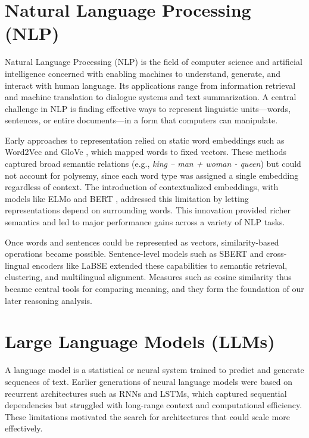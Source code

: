 
\section{Natural Language Processing (NLP)}

Natural Language Processing (NLP) is the field of computer science and artificial intelligence concerned with enabling machines to understand, generate, and interact with human language. Its applications range from information retrieval and machine translation to dialogue systems and text summarization. A central challenge in NLP is finding effective ways to represent linguistic units—words, sentences, or entire documents—in a form that computers can manipulate.

Early approaches to representation relied on static word embeddings such as Word2Vec and GloVe \parencite{mikolov2013word2vec,pennington2014glove}, which mapped words to fixed vectors. These methods captured broad semantic relations (e.g., \emph{king – man + woman - queen}) but could not account for polysemy, since each word type was assigned a single embedding regardless of context. The introduction of contextualized embeddings, with models like ELMo and BERT \parencite{peters2018elmo,devlin2019bert}, addressed this limitation by letting representations depend on surrounding words. This innovation provided richer semantics and led to major performance gains across a variety of NLP tasks.

Once words and sentences could be represented as vectors, similarity-based operations became possible. Sentence-level models such as SBERT \parencite{reimers2019sbert} and cross-lingual encoders like LaBSE \parencite{feng2020labse} extended these capabilities to semantic retrieval, clustering, and multilingual alignment. Measures such as cosine similarity thus became central tools for comparing meaning, and they form the foundation of our later reasoning analysis.

\section{Large Language Models (LLMs)}

A language model is a statistical or neural system trained to predict and generate sequences of text. Earlier generations of neural language models were based on recurrent architectures such as RNNs and LSTMs, which captured sequential dependencies but struggled with long-range context and computational efficiency. These limitations motivated the search for architectures that could scale more effectively.

